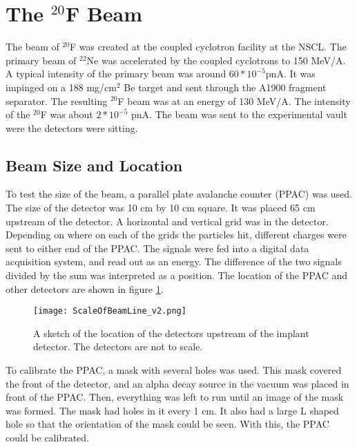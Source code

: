 \documentclass[../MaxHughesThesis.tex]{subfiles}
\begin{document}
\section{The $^{20}$F Beam}

The beam of $^{20}$F was created at the coupled cyclotron facility at the NSCL.
The primary beam of $^{22}$Ne was accelerated by the coupled cyclotrons to 150 MeV/A. 
A typical intensity of the primary beam was around $60 * 10^{-5}$pnA.
It was impinged on a 188 mg/cm$^{2}$ Be target and sent through the A1900 fragment separator. 
The resulting $^{20}$F beam was at an energy of 130 MeV/A. 
The intensity of the $^{20}$F was about $2 * 10^{-5}$ pnA.
The beam was sent to the experimental vault were the detectors were sitting.

\subsection{Beam Size and Location}
To test the size of the beam, a parallel plate avalanche counter (PPAC) was used.
The size of the detector was 10 cm by 10 cm square. 
It was placed 65 cm upstream of the detector.
A horizontal and vertical grid was in the detector.
Depending on where on each of the grids the particles hit, different charges were sent to either end of the PPAC.
The signals were fed into a digital data acquisition system, and read out as an energy.
The difference of the two signals divided by the sum was interpreted as a position.
The location of the PPAC and other detectors are shown in figure \ref{fig:BeamSetUp}.

\begin{figure}
	\centerline{\texttt{[image: ScaleOfBeamLine\_v2.png]}}
	\caption{A sketch of the location of the detectors upstream of the implant detector.
		    The detectors are not to scale. 
			}
	\label{fig:BeamSetUp}
\end{figure}  

To calibrate the PPAC, a mask with several holes was used. 
This mask covered the front of the detector, and an alpha decay source in the vacuum was placed in front of the PPAC.
Then, everything was left to run until an image of the mask was formed.
The mask had holes in it every 1 cm. 
It also had a large L shaped hole so that the orientation of the mask could be seen. 
With this, the PPAC could be calibrated.
\end{document}
